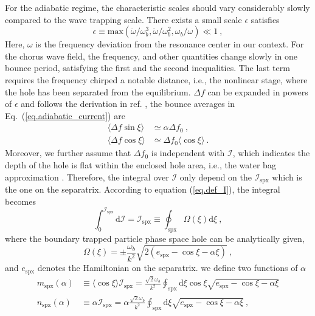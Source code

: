 For the adiabatic regime, the characteristic scales should vary considerably slowly compared to the wave trapping scale.
There exists a small scale $\epsilon$ satisfies \cite{berk1999}
\begin{equation}
    \epsilon \equiv \mathrm{max}\left(\ddot{\omega}/\omega_b^3, \dot{\omega}/\omega_b^2, \omega_b/\omega \right) \ll 1~,
\end{equation}
Here, $\omega$ is the frequency deviation from the resonance center in our context.
For the chorus wave field, the frequency, and other quantities change slowly in one bounce period, satisfying the first and the second inequalities. The last term requires the frequency chirped a notable distance, i.e., the nonlinear stage, where the hole has been separated from the equilibrium.
$\Delta f$ can be expanded in powers of $\epsilon$ and follows the derivation in ref. \cite{berk1999}, the bounce averages in Eq.~(\ref{eq.adiabatic_current}) are
\begin{equation}
    \begin{aligned}
    \langle\Delta f \sin \xi \rangle &\simeq \alpha \Delta f_0 ~, \\ 
    \langle \Delta f \cos \xi \rangle &\simeq  \Delta f_0 \langle \cos \xi \rangle ~.
    \end{aligned}
\end{equation}
Moreover, we further assume that $\Delta f_0$ is independent with $\mathcal{I}$, which indicates the depth of the hole is flat within the enclosed hole area, i.e., the water bag approximation \cite{omura_theory_2008,hezaveh2021}. 
Therefore, the integral over $\mathcal{I}$ only depend on the $\mathcal{I}_\mathrm{spx}$ which is the one on the separatrix. 
According to equation (\ref{eq.def_I}), the integral becomes
\begin{equation}
    \int^{\mathcal{I}_\mathrm{s p x}}_0 \mathrm{d}\mathcal{I} = \mathcal{I}_\mathrm{s p x} \equiv \oint_\mathrm{s p x} \Omega (\xi) \mathrm{d} \xi~,
\end{equation}
where the boundary trapped particle phase space hole can be analytically given,
\begin{equation}
    \Omega(\xi) = \pm \frac{\omega_b}{k^2} \sqrt{2 (e_\mathrm{spx}-\cos \xi - \alpha \xi)}~,
\end{equation}
and $e_\mathrm{spx}$ denotes the Hamiltonian on the separatrix. 
\Now we define two functions of $\alpha$
\begin{equation}\label{eq.function}
    \begin{aligned}
        m_\mathrm{spx}(\alpha) & \equiv \langle \cos \xi \rangle  \mathcal{I}_\mathrm{spx} = \frac{\sqrt{2} \omega_b}{k^2} \oint_\mathrm{s p x} \mathrm{d} \xi \cos \xi \sqrt{e_\mathrm{s p x}-\cos \xi-\alpha \xi} 
        \\
        n_\mathrm{spx}(\alpha) & \equiv \alpha \mathcal{I}_\mathrm{spx} = \alpha \frac{\sqrt{2} \omega_b}{k^2} \oint_\mathrm{s p x} \mathrm{d} \xi \sqrt{e_\mathrm{s p x}-\cos \xi-\alpha \xi}~,
    \end{aligned}
\end{equation}
